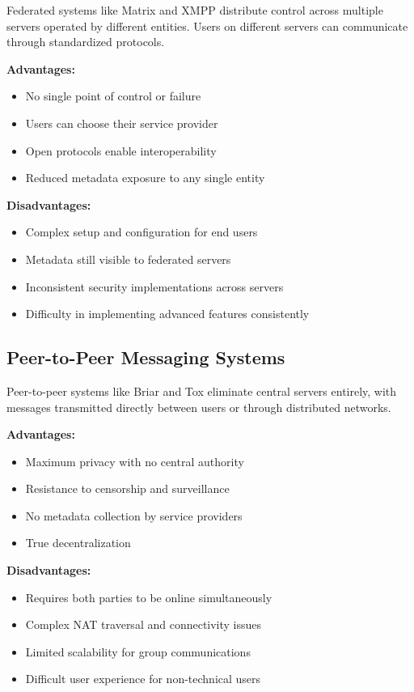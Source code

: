 Federated systems like Matrix and XMPP distribute control across multiple servers operated by different entities. Users on different servers can communicate through standardized protocols.

\textbf{Advantages:}
\begin{itemize}
    \item No single point of control or failure
    \item Users can choose their service provider
    \item Open protocols enable interoperability
    \item Reduced metadata exposure to any single entity
\end{itemize}

\textbf{Disadvantages:}
\begin{itemize}
    \item Complex setup and configuration for end users
    \item Metadata still visible to federated servers
    \item Inconsistent security implementations across servers
    \item Difficulty in implementing advanced features consistently
\end{itemize}

\subsection{Peer-to-Peer Messaging Systems}

Peer-to-peer systems like Briar and Tox eliminate central servers entirely, with messages transmitted directly between users or through distributed networks.

\textbf{Advantages:}
\begin{itemize}
    \item Maximum privacy with no central authority
    \item Resistance to censorship and surveillance
    \item No metadata collection by service providers
    \item True decentralization
\end{itemize}

\textbf{Disadvantages:}
\begin{itemize}
    \item Requires both parties to be online simultaneously
    \item Complex NAT traversal and connectivity issues
    \item Limited scalability for group communications
    \item Difficult user experience for non-technical users
\end{itemize}

